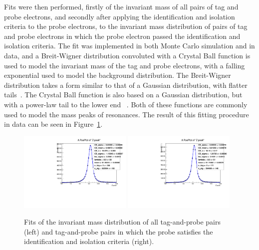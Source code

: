 Fits were then performed, firstly of the invariant mass of all pairs of tag and probe electrons, and secondly
after applying the identification and isolation criteria to the probe electrons, to the invariant mass
distribution of pairs of tag and probe electrons in which the probe electron passed the identification and
isolation criteria. The fit was implemented in both Monte Carlo simulation and in data, and a Breit-Wigner
distribution convoluted with a Crystal Ball function is used to model the invariant mass of the tag and probe
electrons, with a falling exponential used to model the background distribution. The Breit-Wigner distribution
takes a form similar to that of a Gaussian distribution, with flatter tails~\cite{PhysRev.49.519}. The Crystal
Ball function is also based on a Gaussian distribution, but with a power-law tail to the lower end
~\cite{Oreglia,Gaiser,Skwarnicki}. Both of these functions are commonly used to model the mass peaks of
resonances. The result of this fitting procedure in data can be seen in
Figure~\ref{fig:electron_id_iso_efficiency_invariant_Z_mass_fits_data}.

\begin{figure}[hbtp]
    \centering
      \includegraphics[width=0.48\textwidth]{Chapters/07_08_09_Analysis/Images/lepton_scale_factors/CBConvolution/electron/data/id_iso/tagProbe_total_Z_peak}\hfill
      \includegraphics[width=0.48\textwidth]{Chapters/07_08_09_Analysis/Images/lepton_scale_factors/CBConvolution/electron/data/id_iso/tagProbe_passed_Z_peak}\\
     \caption[Fits of the invariant mass distribution of all tag-and-probe pairs and tag-and-probe pairs in
     which the probe satisfies the identification and isolation criteria.]{Fits of the invariant mass
     distribution of all tag-and-probe pairs (left) and tag-and-probe pairs in which the probe satisfies
     the identification and isolation criteria (right).}
     \label{fig:electron_id_iso_efficiency_invariant_Z_mass_fits_data}
\end{figure}

